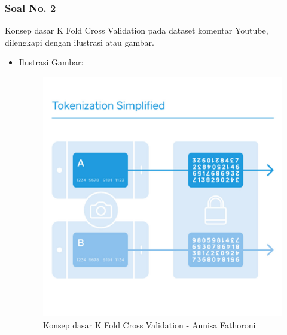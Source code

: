 \subsubsection{Soal No. 2}
Konsep dasar K Fold Cross Validation pada dataset komentar Youtube, dilengkapi dengan ilustrasi atau gambar.

\begin{itemize}
\item Ilustrasi Gambar:

\begin{figure}[!hbtp]
\centering
\includegraphics[scale=0.4]{figures/Chapter 7/1164067/Teori/Chapter7AnnisaFathoroni1.jpg}
\caption{Konsep dasar K Fold Cross Validation - Annisa Fathoroni}
\label{Konsep dasar K Fold Cross Validation - Annisa Fathoroni}
\end{figure}

\end{itemize}

